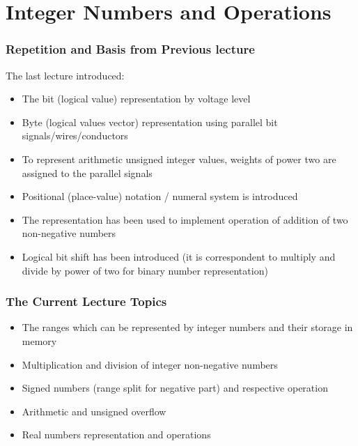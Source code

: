 \documentclass{beamer}
\subtitle{Lecture 02. Integer and Floating Point Numbers}
\author{Pavel Píša \phantom{xxxxxxxxx} Petr Štěpán \\ \small\texttt{pisa@fel.cvut.cz}\phantom{xxxx}\small\texttt{stepan@fel.cvut.cz}}
\begin{document}
\maketitle

\section{Integer Numbers and Operations}

\begin{frame}
\frametitle{Repetition and Basis from Previous lecture}
The last lecture introduced:
\begin{itemize}
\item The bit (logical value) representation by voltage level
\item Byte (logical values vector) representation using parallel bit signals/wires/conductors
\item To represent arithmetic unsigned integer values, weights of power two are assigned to the parallel signals
\item Positional (place-value) notation / numeral system is introduced
\item The representation has been used to implement operation of addition of two non-negative numbers
\item Logical bit shift has been introduced (it is correspondent to multiply and divide by power of two for binary number representation)
\end{itemize}
\end{frame}


\begin{frame}
\frametitle{The Current Lecture Topics}
\begin{itemize}
\item The ranges which can be represented by integer numbers and their storage in memory
\item Multiplication and division of integer non-negative numbers
\item Signed numbers (range split for negative part) and respective operation
\item Arithmetic and unsigned overflow
\item Real numbers representation and operations
\end{itemize}
\end{frame}
\end{document}
